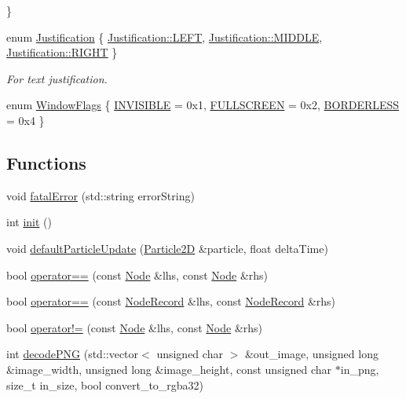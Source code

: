 \begin{DoxyCompactItemize}
 \}
\item 
enum \hyperlink{namespace_otherwise_a9eef3c22cbba8efff0211f92a1ed2792}{Justification} \{ \hyperlink{namespace_otherwise_a9eef3c22cbba8efff0211f92a1ed2792a684d325a7303f52e64011467ff5c5758}{Justification\+::\+L\+E\+FT}, 
\hyperlink{namespace_otherwise_a9eef3c22cbba8efff0211f92a1ed2792a43eedd8685eb86592022f8da962e3474}{Justification\+::\+M\+I\+D\+D\+LE}, 
\hyperlink{namespace_otherwise_a9eef3c22cbba8efff0211f92a1ed2792a21507b40c80068eda19865706fdc2403}{Justification\+::\+R\+I\+G\+HT}
 \}\begin{DoxyCompactList}\small\item\em For text justification. \end{DoxyCompactList}
\item 
enum \hyperlink{namespace_otherwise_affaa1e0413b5cf1eaf35da42836d3ae8}{Window\+Flags} \{ \hyperlink{namespace_otherwise_affaa1e0413b5cf1eaf35da42836d3ae8a034de8d36689f8bc1673257024b8aba4}{I\+N\+V\+I\+S\+I\+B\+LE} = 0x1, 
\hyperlink{namespace_otherwise_affaa1e0413b5cf1eaf35da42836d3ae8a01c2323f11877bcb84b30bba0e8915cf}{F\+U\+L\+L\+S\+C\+R\+E\+EN} = 0x2, 
\hyperlink{namespace_otherwise_affaa1e0413b5cf1eaf35da42836d3ae8a47a78500c53fb759c0e2bc3bcb4fb2fa}{B\+O\+R\+D\+E\+R\+L\+E\+SS} = 0x4
 \}
\end{DoxyCompactItemize}
\subsection*{Functions}
\begin{DoxyCompactItemize}
\item 
void \hyperlink{namespace_otherwise_a31f746eab61d4cf3a75ec998799d5710}{fatal\+Error} (std\+::string error\+String)
\item 
int \hyperlink{namespace_otherwise_a235559dfa22004cafb278703e9121a2c}{init} ()
\item 
void \hyperlink{namespace_otherwise_ac7cfb6f643b2ea32aa02502159d17fb6}{default\+Particle\+Update} (\hyperlink{class_otherwise_1_1_particle2_d}{Particle2D} \&particle, float delta\+Time)
\item 
bool \hyperlink{namespace_otherwise_a27a39e05e10a383316ec8881d4f76c54}{operator==} (const \hyperlink{struct_otherwise_1_1_node}{Node} \&lhs, const \hyperlink{struct_otherwise_1_1_node}{Node} \&rhs)
\item 
bool \hyperlink{namespace_otherwise_a4fab022ff458efa054c3367761497fdf}{operator==} (const \hyperlink{struct_otherwise_1_1_node_record}{Node\+Record} \&lhs, const \hyperlink{struct_otherwise_1_1_node_record}{Node\+Record} \&rhs)
\item 
bool \hyperlink{namespace_otherwise_a69a7d80f9434a4cc4104b3aa3d88707e}{operator!=} (const \hyperlink{struct_otherwise_1_1_node}{Node} \&lhs, const \hyperlink{struct_otherwise_1_1_node}{Node} \&rhs)
\item 
int \hyperlink{namespace_otherwise_a75162ea3363f2e1a21c2566f62b2fc3d}{decode\+P\+NG} (std\+::vector$<$ unsigned char $>$ \&out\+\_\+image, unsigned long \&image\+\_\+width, unsigned long \&image\+\_\+height, const unsigned char $\ast$in\+\_\+png, size\+\_\+t in\+\_\+size, bool convert\+\_\+to\+\_\+rgba32)
\end{DoxyCompactItemize}


